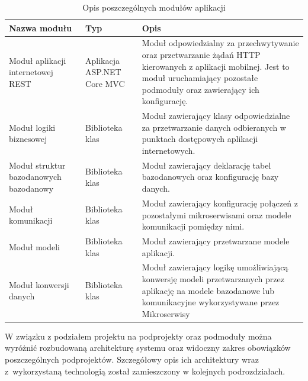 {\begin{table}[htbp]
	\caption{Opis poszczególnych modułów aplikacji}
	\label{project-architecture}
	\begin{center}
		\begin{tabular}{ | p{3cm}| p{3cm} | p{6cm} |}
			\hline Nazwa modułu & Typ &  Opis \\ \hline   
			
			\hline  Moduł aplikacji internetowej REST &  Aplikacja ASP.NET Core MVC & Moduł odpowiedzialny za przechwytywanie oraz przetwarzanie żądań HTTP kierowanych z aplikacji mobilnej. Jest to moduł uruchamiający pozostałe podmoduły oraz zawierający ich konfigurację.\\ \hline
			
			\hline  Moduł logiki biznesowej & Biblioteka klas & Moduł zawierający klasy odpowiedzialne za przetwarzanie danych odbieranych w punktach dostępowych aplikacji internetowych. \\ \hline
			
			\hline Moduł struktur bazodanowych \mbox{bazodanowy} & Biblioteka klas & Moduł zawierający deklarację tabel bazodanowych oraz konfigurację bazy danych.\\ \hline
			
			\hline Moduł komunikacji & Biblioteka klas & Moduł zawierający konfigurację połączeń z pozostałymi mikroserwisami oraz modele komunikacji pomiędzy nimi.\\ \hline
			
			\hline Moduł modeli & Biblioteka klas & Moduł zawierający przetwarzane modele aplikacji.\\ \hline
			
			
			\hline Moduł konwersji danych & Biblioteka klas & Moduł zawierający logikę umożliwiającą konwersję modeli przetwarzanych przez aplikację na modele bazodanowe lub komunikacyjne wykorzystywane przez Mikroserwisy\\ \hline

		\end{tabular}
	\end{center}
\end{table}	

W związku z podziałem projektu na podprojekty oraz podmoduły można wyróżnić rozbudowaną architekturę systemu oraz widoczny zakres obowiązków poszczególnych podprojektów. Szczegółowy opis ich architektury wraz z~wykorzystaną technologią został zamieszczony w kolejnych podrozdziałach.}


